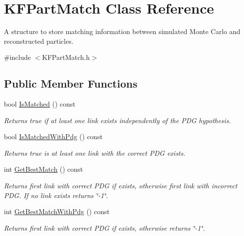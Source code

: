 \hypertarget{structKFPartMatch}{}\section{K\+F\+Part\+Match Class Reference}
\label{structKFPartMatch}


A structure to store matching information between simulated Monte Carlo and reconstructed particles.  




{\ttfamily \#include $<$K\+F\+Part\+Match.\+h$>$}

\subsection*{Public Member Functions}
\begin{DoxyCompactItemize}
\item 
bool \hyperlink{structKFPartMatch_a878ef37a5233c9f3f0d51fc92ffd5329}{Is\+Matched} () const \hypertarget{structKFPartMatch_a878ef37a5233c9f3f0d51fc92ffd5329}{}\label{structKFPartMatch_a878ef37a5233c9f3f0d51fc92ffd5329}

\begin{DoxyCompactList}\small\item\em Returns true if at least one link exists independently of the P\+DG hypothesis. \end{DoxyCompactList}\item 
bool \hyperlink{structKFPartMatch_a916971414a26f7da2ab3644001bbd419}{Is\+Matched\+With\+Pdg} () const \hypertarget{structKFPartMatch_a916971414a26f7da2ab3644001bbd419}{}\label{structKFPartMatch_a916971414a26f7da2ab3644001bbd419}

\begin{DoxyCompactList}\small\item\em Returns true is at least one link with the correct P\+DG exists. \end{DoxyCompactList}\item 
int \hyperlink{structKFPartMatch_a0f9f701122c46ad1a16cdae2e14c9502}{Get\+Best\+Match} () const \hypertarget{structKFPartMatch_a0f9f701122c46ad1a16cdae2e14c9502}{}\label{structKFPartMatch_a0f9f701122c46ad1a16cdae2e14c9502}

\begin{DoxyCompactList}\small\item\em Returns first link with correct P\+DG if exists, otherwise first link with incorrect P\+DG. If no link exists returns \char`\"{}-\/1\char`\"{}. \end{DoxyCompactList}\item 
int \hyperlink{structKFPartMatch_a7ef9427e68ea9dfb4e18ea07290c6aab}{Get\+Best\+Match\+With\+Pdg} () const \hypertarget{structKFPartMatch_a7ef9427e68ea9dfb4e18ea07290c6aab}{}\label{structKFPartMatch_a7ef9427e68ea9dfb4e18ea07290c6aab}

\begin{DoxyCompactList}\small\item\em Returns first link with correct P\+DG if exists, otherwise returns \char`\"{}-\/1\char`\"{}. \end{DoxyCompactList}\end{DoxyCompactItemize}

